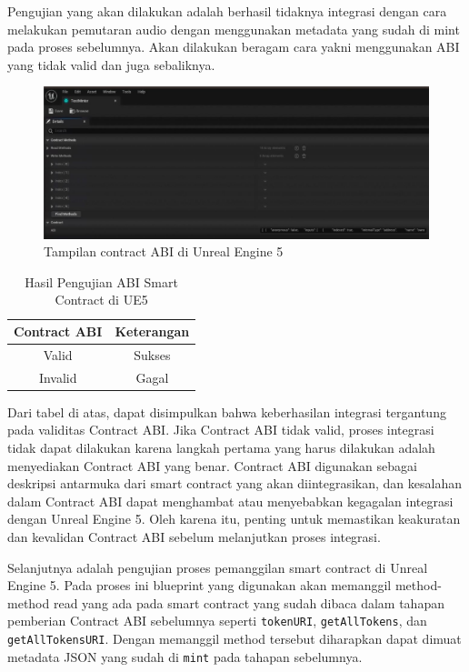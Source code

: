 Pengujian yang akan dilakukan adalah berhasil tidaknya integrasi dengan cara
melakukan pemutaran audio dengan menggunakan metadata yang sudah di mint pada proses sebelumnya.
Akan dilakukan beragam cara yakni menggunakan ABI yang tidak valid dan juga sebaliknya.

\begin{figure}[H]
  \centering

  \includegraphics[scale=0.35]{gambar/contract-abi.jpg}

  \caption{Tampilan contract ABI di Unreal Engine 5}
  \label{fig:contractabiue5}
\end{figure}

\begin{longtable}{|c|c|}
  \caption{Hasil Pengujian ABI Smart Contract di UE5}
  \label{tb:UjiIntegrasiUE5ABI}               \\
  \hline
  \rowcolor[HTML]{C0C0C0}
  \textbf{Contract ABI} & \textbf{Keterangan} \\
  \hline
  Valid                 & Sukses              \\
  Invalid               & Gagal               \\
  \hline
\end{longtable}

Dari tabel di atas, dapat disimpulkan bahwa keberhasilan integrasi tergantung pada validitas Contract ABI. Jika Contract ABI tidak valid, proses integrasi tidak dapat dilakukan karena langkah pertama yang harus dilakukan adalah
menyediakan Contract ABI yang benar. Contract ABI digunakan sebagai deskripsi antarmuka dari smart contract yang akan diintegrasikan, dan kesalahan dalam Contract ABI dapat menghambat atau menyebabkan kegagalan integrasi dengan Unreal Engine 5. Oleh karena itu, penting untuk memastikan keakuratan dan kevalidan Contract ABI sebelum melanjutkan proses integrasi.

Selanjutnya adalah pengujian proses pemanggilan smart contract di Unreal Engine 5. Pada proses ini
blueprint yang digunakan akan memanggil method-method read yang ada pada smart contract yang sudah dibaca dalam tahapan pemberian Contract ABI sebelumnya seperti \texttt{tokenURI}, \texttt{getAllTokens}, dan \texttt{getAllTokensURI}. Dengan memanggil method tersebut diharapkan dapat dimuat metadata JSON yang sudah di \texttt{mint}
pada tahapan sebelumnya.

